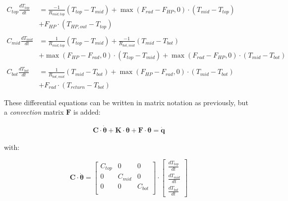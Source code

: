 {\color{teal}
	\begin{equation}
		\begin{aligned}
			C_{top}\frac{dT_{top}}{dt} &= \frac{-1}{R_{mid, top}} (T_{top}-T_{mid}) + \max(F_{rad}-F_{HP}, 0) \cdot (T_{mid} - T_{top}) \\
			&+ F_{HP} \cdot (T_{HP,out} - T_{top})
			\\ \\
			C_{mid}\frac{dT_{mid}}{dt} &= \frac{1}{R_{mid, top}} (T_{top}-T_{mid}) + \frac{-1}{R_{bot, mid}}(T_{mid}-T_{bot}) \\
			& + \max(F_{HP}-F_{rad}, 0) \cdot (T_{top} - T_{mid}) + \max(F_{rad}-F_{HP}, 0)  \cdot (T_{mid} - T_{bot}) 
			\\ \\
			C_{bot}\frac{dT_{bot}}{dt} &= \frac{1}{R_{bot, mid}} (T_{mid}-T_{bot}) + \max(F_{HP} - F_{rad}, 0) \cdot (T_{mid} - T_{bot})\\
			& + F_{rad} \cdot (T_{return} - T_{bot}) 
		\end{aligned}
	\end{equation}
}

These differential equations can be written in matrix notation as previously, but a \emph{convection} matrix $\mathbf{F}$ is added:

\begin{subequations}
	\label{eq:matnot}
	\begin{align}
		\mathbf{C} \cdot \boldsymbol{\dot{\theta}} + \mathbf{K} \cdot \boldsymbol{\theta} + \mathbf{F} \cdot \boldsymbol{\theta}= \mathbf{\dot{q}}
	\end{align}
\end{subequations}

with:

\begin{equation}
	\mathbf{C} \cdot \boldsymbol{\dot{\theta}} =
	\begin{bmatrix}
		C_{top} & 0 & 0 \\
		0 &  C_{mid} & 0 \\
		0 & 0 & C_{bot} \\
	\end{bmatrix}
	\cdot
	\begin{bmatrix}
		\frac{dT_{top}}{dt} \\
		\frac{dT_{mid}}{dt} \\
		\frac{dT_{bot}}{dt}
	\end{bmatrix}
\end{equation}

